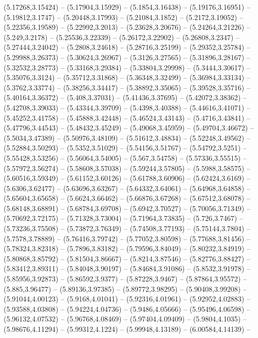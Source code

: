 {(5.17268,3.15424) -- (5.17904,3.15929) -- (5.1854,3.16438) -- (5.19176,3.16951) -- (5.19812,3.1747) -- (5.20448,3.17993) -- (5.21084,3.1852) -- (5.2172,3.19052) -- (5.22356,3.19589) -- (5.22992,3.2013) -- (5.23628,3.20676) -- (5.24264,3.21226) --
(5.249,3.2178) -- (5.25536,3.22339) -- (5.26172,3.22902) -- (5.26808,3.2347) -- (5.27444,3.24042) -- (5.2808,3.24618) -- (5.28716,3.25199) -- (5.29352,3.25784) -- (5.29988,3.26373) -- (5.30624,3.26967) -- (5.3126,3.27565) -- (5.31896,3.28167) --
(5.32532,3.28773) -- (5.33168,3.29384) -- (5.33804,3.29998) -- (5.3444,3.30617) -- (5.35076,3.3124) -- (5.35712,3.31868) -- (5.36348,3.32499) -- (5.36984,3.33134) -- (5.3762,3.33774) -- (5.38256,3.34417) -- (5.38892,3.35065) -- (5.39528,3.35716) --
(5.40164,3.36372) -- (5.408,3.37031) -- (5.41436,3.37695) -- (5.42072,3.38362) -- (5.42708,3.39033) -- (5.43344,3.39709) -- (5.4398,3.40388) -- (5.44616,3.41071) -- (5.45252,3.41758) -- (5.45888,3.42448) -- (5.46524,3.43143) -- (5.4716,3.43841) --
(5.47796,3.44543) -- (5.48432,3.45249) -- (5.49068,3.45959) -- (5.49704,3.46672) -- (5.5034,3.47389) -- (5.50976,3.48109) -- (5.51612,3.48834) -- (5.52248,3.49562) -- (5.52884,3.50293) -- (5.5352,3.51029) -- (5.54156,3.51767) -- (5.54792,3.5251) --
(5.55428,3.53256) -- (5.56064,3.54005) -- (5.567,3.54758) -- (5.57336,3.55515) -- (5.57972,3.56274) -- (5.58608,3.57038) -- (5.59244,3.57805) -- (5.5988,3.58575) -- (5.60516,3.59349) -- (5.61152,3.60126) -- (5.61788,3.60906) -- (5.62424,3.6169) --
(5.6306,3.62477) -- (5.63696,3.63267) -- (5.64332,3.64061) -- (5.64968,3.64858) -- (5.65604,3.65658) -- (5.6624,3.66462) -- (5.66876,3.67268) -- (5.67512,3.68078) -- (5.68148,3.68891) -- (5.68784,3.69708) -- (5.6942,3.70527) -- (5.70056,3.71349) --
(5.70692,3.72175) -- (5.71328,3.73004) -- (5.71964,3.73835) -- (5.726,3.7467) -- (5.73236,3.75508) -- (5.73872,3.76349) -- (5.74508,3.77193) -- (5.75144,3.7804) -- (5.7578,3.78889) -- (5.76416,3.79742) -- (5.77052,3.80598) -- (5.77688,3.81456) --
(5.78324,3.82318) -- (5.7896,3.83182) -- (5.79596,3.84049) -- (5.80232,3.84919) -- (5.80868,3.85792) -- (5.81504,3.86667) -- (5.8214,3.87546) -- (5.82776,3.88427) -- (5.83412,3.89311) -- (5.84048,3.90197) -- (5.84684,3.91086) -- (5.8532,3.91978) --
(5.85956,3.92873) -- (5.86592,3.9377) -- (5.87228,3.9467) -- (5.87864,3.95572) -- (5.885,3.96477) -- (5.89136,3.97385) -- (5.89772,3.98295) -- (5.90408,3.99208) -- (5.91044,4.00123) -- (5.9168,4.01041) -- (5.92316,4.01961) -- (5.92952,4.02883) --
(5.93588,4.03808) -- (5.94224,4.04736) -- (5.9486,4.05666) -- (5.95496,4.06598) -- (5.96132,4.07532) -- (5.96768,4.08469) -- (5.97404,4.09409) -- (5.9804,4.1035) -- (5.98676,4.11294) -- (5.99312,4.1224) -- (5.99948,4.13189) -- (6.00584,4.14139) --
}
